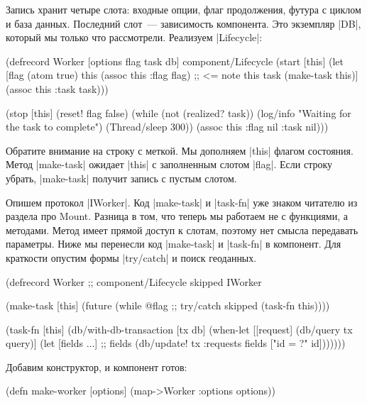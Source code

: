 Запись хранит четыре слота: входные опции, флаг продолжения, футура с циклом и
база данных. Последний слот~--- зависимость компонента. Это экземпляр
\spverb|DB|, который мы только что рассмотрели. Реализуем \spverb|Lifecycle|:

\begin{english}
  \begin{clojure}
(defrecord Worker
  [options flag task db]
  component/Lifecycle
  (start [this]
    (let [flag (atom true)
          this (assoc this :flag flag) ;; <= note this
          task (make-task this)]
      (assoc this :task task)))

  (stop [this]
    (reset! flag false)
    (while (not (realized? task))
      (log/info "Waiting for the task to complete")
      (Thread/sleep 300))
    (assoc this :flag nil :task nil)))
  \end{clojure}
\end{english}

Обратите внимание на строку с меткой. Мы дополняем \spverb|this| флагом
состояния. Метод \spverb|make-task| ожидает \spverb|this| с заполненным слотом
\spverb|flag|. Если строку убрать, \spverb|make-task| получит запись с пустым
слотом.

Опишем протокол \spverb|IWorker|. Код \spverb|make-task| и \spverb|task-fn| уже
знаком читателю из раздела про Mount. Разница в том, что теперь мы
работаем не с функциями, а методами. Метод имеет прямой доступ к слотам, поэтому
нет смысла передавать параметры. Ниже мы перенесли код \spverb|make-task| и
\spverb|task-fn| в компонент. Для краткости опустим формы \spverb|try/catch| и
поиск геоданных.

\begin{english}
  \begin{clojure}
(defrecord Worker
  ;; component/Lifecycle skipped
  IWorker

  (make-task [this]
    (future
      (while @flag ;; try/catch skipped
        (task-fn this))))

  (task-fn [this]
    (db/with-db-transaction [tx db]
      (when-let [[request] (db/query tx query)]
        (let [fields ...] ;; fields
          (db/update! tx :requests
                      fields ["id = ?" id]))))))
  \end{clojure}
\end{english}

Добавим конструктор, и компонент готов:

\begin{english}
  \begin{clojure}
(defn make-worker
  [options]
  (map->Worker {:options options}))
  \end{clojure}
\end{english}

